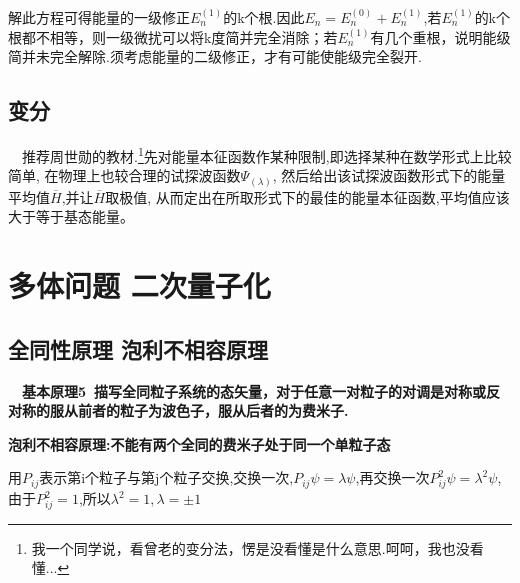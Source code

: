 \documentclass[13pt,a4paper]{article}
\begin{document}
\begin{CJK}{UTF8}{song}
解此方程可得能量的一级修正$E_n^{(1)}$的k个根.因此$E_n=E_n^{(0)}+E_n^{(1)}$,若$E_n^{(1)}$的k个根都不相等，则一级微扰可以将k度简并完全消除；若$E_n^{(1)}$有几个重根，说明能级简并未完全解除.须考虑能量的二级修正，才有可能使能级完全裂开.



\subsection{变分 }

\ \ 推荐周世勋的教材.\footnote{我一个同学说，看曾老的变分法，愣是没看懂是什么意思.呵呵，我也没看懂...}先对能量本征函数作某种限制,即选择某种在数学形式上比较简单, 在物理上也较合理的试探波函数$\Psi_{(\lambda)}$, 然后给出该试探波函数形式下的能量平均值$\overline{H}$,并让$\overline{H}$取极值, 从而定出在所取形式下的最佳的能量本征函数,平均值应该大于等于基态能量。

\section{多体问题 二次量子化}

\subsection{全同性原理 泡利不相容原理}
\ \ \textbf{基本原理5\ 描写全同粒子系统的态矢量，对于任意一对粒子的对调是对称或反对称的服从前者的粒子为波色子，服从后者的为费米子.}

\textbf{泡利不相容原理:不能有两个全同的费米子处于同一个单粒子态}

用$P_{ij}$表示第i个粒子与第j个粒子交换,交换一次,$P_{ij}\psi=\lambda\psi$,再交换一次$P_{ij}^2\psi=\lambda^2\psi$,由于$P^2_{ij}=1$,所以$\lambda^2=1,\lambda=\pm 1$



\newpage 
\end{CJK}
\end{document}

